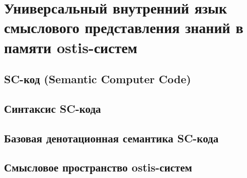 \chapter{Универсальный внутренний язык смыслового представления знаний в памяти ostis-систем}
\label{chapter_sc_code}


\section{SC-код (Semantic Computer Code)}
\section{Синтаксис SC-кода}
\section{Базовая денотационная семантика SC-кода}
\section{Смысловое пространство ostis-систем}

%